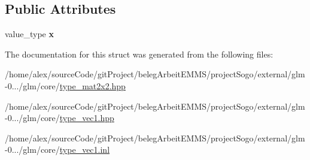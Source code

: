 \subsection*{Public Attributes}
\begin{DoxyCompactItemize}
\item 
\hypertarget{structglm_1_1detail_1_1tvec1_a0c881ef566673e7fb8e6e6703695a461}{value\-\_\-type {\bfseries x}}\label{structglm_1_1detail_1_1tvec1_a0c881ef566673e7fb8e6e6703695a461}

\end{DoxyCompactItemize}


The documentation for this struct was generated from the following files\-:\begin{DoxyCompactItemize}
\item 
/home/alex/source\-Code/git\-Project/beleg\-Arbeit\-E\-M\-M\-S/project\-Sogo/external/glm-\/0.../glm/core/\hyperlink{type__mat2x2_8hpp}{type\-\_\-mat2x2.\-hpp}\item 
/home/alex/source\-Code/git\-Project/beleg\-Arbeit\-E\-M\-M\-S/project\-Sogo/external/glm-\/0.../glm/core/\hyperlink{type__vec1_8hpp}{type\-\_\-vec1.\-hpp}\item 
/home/alex/source\-Code/git\-Project/beleg\-Arbeit\-E\-M\-M\-S/project\-Sogo/external/glm-\/0.../glm/core/\hyperlink{type__vec1_8inl}{type\-\_\-vec1.\-inl}\end{DoxyCompactItemize}
